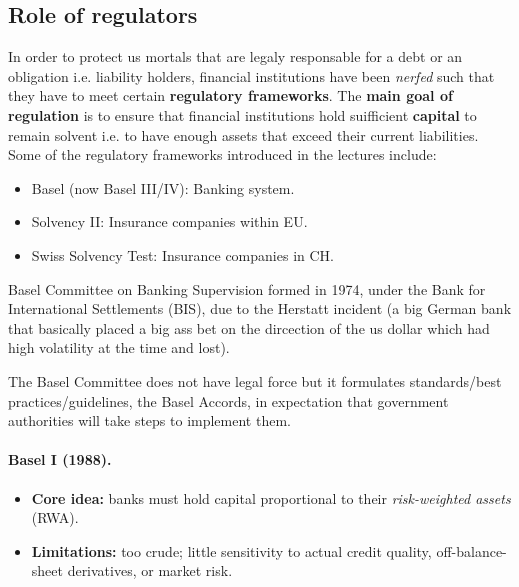 \subsection*{Role of regulators}
In order to protect us mortals that are legaly responsable for a debt or an obligation i.e. liability holders, financial institutions have been \textit{nerfed} such that they have to meet certain
\textbf{regulatory frameworks}. The \textbf{main goal of regulation} is to ensure that financial institutions hold suifficient \textbf{capital} to remain solvent i.e. to have enough assets that exceed their current liabilities. Some of the regulatory frameworks introduced in the lectures include:

\begin{itemize}
    \item Basel (now Basel III/IV): Banking system.
    \item Solvency II: Insurance companies within EU.
    \item Swiss Solvency Test: Insurance companies in CH.
\end{itemize}

Basel Committee on Banking Supervision formed in 1974, under the Bank for International Settlements (BIS), due to the Herstatt incident (a big German bank that basically placed a big ass bet on the dircection of the us dollar which had high volatility at the time and lost). 

\begin{remark}
    The Basel Committee does not have legal force but it formulates standards/best practices/guidelines, the Basel Accords, in expectation that government authorities
    will take steps to implement them.
\end{remark}

\paragraph{Basel I (1988).}
\begin{itemize}
  \item \textbf{Core idea:} banks must hold capital proportional to their \emph{risk-weighted assets} (RWA).
  \item \textbf{Limitations:} too crude; little sensitivity to actual credit quality, off-balance-sheet derivatives, or market risk.
\end{itemize}

